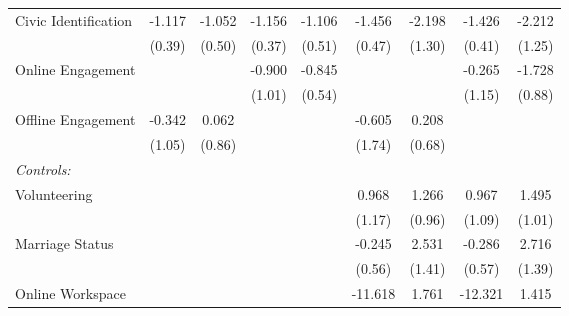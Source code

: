 \begin{table}[htbp]
\begin{tabular}{l*{8}{c}}
\hspace{0.25cm} Civic Identification&-1.117\sym{**} &-1.052\sym{*}  &-1.156\sym{**} &-1.106\sym{*}  &-1.456\sym{**} &-2.198         &-1.426\sym{**} &-2.212         \\
                              &(0.39)         &(0.50)         &(0.37)         &(0.51)         &(0.47)         &(1.30)         &(0.41)         &(1.25)         \\
\hspace{0.25cm} Online Engagement&              &              &-0.900         &-0.845         &              &              &-0.265         &-1.728         \\
                              &              &              &(1.01)         &(0.54)         &              &              &(1.15)         &(0.88)         \\
\hspace{0.25cm} Offline Engagement&-0.342         &0.062         &              &              &-0.605         &0.208         &              &              \\
                              &(1.05)         &(0.86)         &              &              &(1.74)         &(0.68)         &              &              \\
\emph{Controls:}              &              &              &              &              &              &              &              &              \\
\hspace{0.25cm} Volunteering  &              &              &              &              &0.968         &1.266         &0.967         &1.495         \\
                              &              &              &              &              &(1.17)         &(0.96)         &(1.09)         &(1.01)         \\
\hspace{0.25cm} Marriage Status&              &              &              &              &-0.245         &2.531         &-0.286         &2.716         \\
                              &              &              &              &              &(0.56)         &(1.41)         &(0.57)         &(1.39)         \\
\hspace{0.25cm} Online Workspace&              &              &              &              &-11.618         &1.761         &-12.321\sym{*}  &1.415         \\

\end{tabular}
\end{table}
